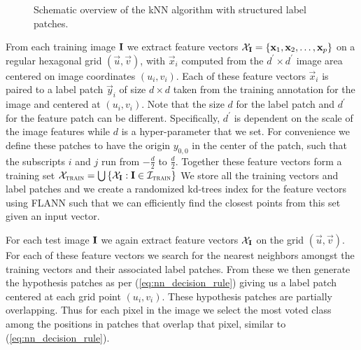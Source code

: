 \begin{figure}[tbh]
\begin{center}
\caption{Schematic overview of the \ac{kNN} algorithm with structured label patches. }
\label{fig:knn_segmentation}
\end{center}
\end{figure}

From each training image $\mathbf{I}$ we extract feature vectors $\mathcal{X}_{\mathbf{I}} = \left\{ \mathbf{x}_1, \mathbf{x}_2, \ldots, \mathbf{x}_p \right\}$ on a regular hexagonal grid $(\vec{u}, \vec{v})$, with $\vec{x}_i$ computed from the $d^\prime \times d^\prime$ image area centered on image coordinates $(u_i, v_i)$. Each of these feature vectors $\vec{x}_i$ is paired to a label patch $\vec{y}_i$ of size $d \times d$ taken from the training annotation for the image and centered at $(u_i, v_i)$. Note that the size $d$ for the label patch and $d^\prime$ for the feature patch can be different. Specifically, $d^\prime$ is dependent on the scale of the image features while $d$ is a hyper-parameter that we set. For convenience we define these patches to have the origin $y_{0,0}$ in the center of the patch, such that the subscripts $i$ and $j$ run from $-\tfrac{d}{2}$ to $\tfrac{d}{2}$. Together these feature vectors form a training set $\mathcal{X}_\textsc{train} = \bigcup\left\{\mathcal{X}_{\mathbf{I}}: \mathbf{I} \in \mathcal{I}_\textsc{train} \right\}$ We store all the training vectors and label patches and we create a randomized kd-trees index for the feature vectors using FLANN \cite{muja2009fast} such that we can efficiently find the closest points from this set given an input vector.

For each test image $\mathbf{I}$ we again extract feature vectors $\mathcal{X}_{\mathbf{I}}$ on the grid $(\vec{u}, \vec{v})$. For each of these feature vectors we search for the nearest neighbors amongst the training vectors and their associated label patches. From these we then generate the hypothesis patches as per (\ref{eq:nn_decision_rule}) giving us a label patch centered at each grid point $(u_i, v_i)$. These hypothesis patches are partially overlapping. Thus for each pixel in the image we select the most voted class among the positions in patches that overlap that pixel, similar to (\ref{eq:nn_decision_rule}).

